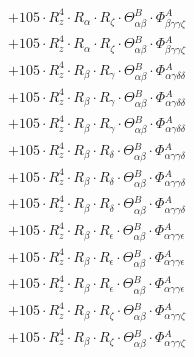 \documentclass{article}
\begin{document}
\begin{subequations}
\begin{gather}
\begin{array}{c}
 \\[0.2em] 		 + 105 \cdot R_{z}^{4} \cdot R_{\alpha{}} \cdot R_{\zeta{}} \cdot \Theta{}^{B}_{\alpha{}\beta{}} \cdot \Phi{}^{A}_{\beta{}\gamma{}\gamma{}\zeta{}} 
 \\[0.2em] 		 + 105 \cdot R_{z}^{4} \cdot R_{\alpha{}} \cdot R_{\zeta{}} \cdot \Theta{}^{B}_{\alpha{}\beta{}} \cdot \Phi{}^{A}_{\beta{}\gamma{}\gamma{}\zeta{}} 
 \\[0.2em] 		 + 105 \cdot R_{z}^{4} \cdot R_{\beta{}} \cdot R_{\gamma{}} \cdot \Theta{}^{B}_{\alpha{}\beta{}} \cdot \Phi{}^{A}_{\alpha{}\gamma{}\delta{}\delta{}} 
 \\[0.2em] 		 + 105 \cdot R_{z}^{4} \cdot R_{\beta{}} \cdot R_{\gamma{}} \cdot \Theta{}^{B}_{\alpha{}\beta{}} \cdot \Phi{}^{A}_{\alpha{}\gamma{}\delta{}\delta{}} 
 \\[0.2em] 		 + 105 \cdot R_{z}^{4} \cdot R_{\beta{}} \cdot R_{\gamma{}} \cdot \Theta{}^{B}_{\alpha{}\beta{}} \cdot \Phi{}^{A}_{\alpha{}\gamma{}\delta{}\delta{}} 
 \\[0.2em] 		 + 105 \cdot R_{z}^{4} \cdot R_{\beta{}} \cdot R_{\delta{}} \cdot \Theta{}^{B}_{\alpha{}\beta{}} \cdot \Phi{}^{A}_{\alpha{}\gamma{}\gamma{}\delta{}} 
 \\[0.2em] 		 + 105 \cdot R_{z}^{4} \cdot R_{\beta{}} \cdot R_{\delta{}} \cdot \Theta{}^{B}_{\alpha{}\beta{}} \cdot \Phi{}^{A}_{\alpha{}\gamma{}\gamma{}\delta{}} 
 \\[0.2em] 		 + 105 \cdot R_{z}^{4} \cdot R_{\beta{}} \cdot R_{\delta{}} \cdot \Theta{}^{B}_{\alpha{}\beta{}} \cdot \Phi{}^{A}_{\alpha{}\gamma{}\gamma{}\delta{}} 
 \\[0.2em] 		 + 105 \cdot R_{z}^{4} \cdot R_{\beta{}} \cdot R_{\epsilon{}} \cdot \Theta{}^{B}_{\alpha{}\beta{}} \cdot \Phi{}^{A}_{\alpha{}\gamma{}\gamma{}\epsilon{}} 
 \\[0.2em] 		 + 105 \cdot R_{z}^{4} \cdot R_{\beta{}} \cdot R_{\epsilon{}} \cdot \Theta{}^{B}_{\alpha{}\beta{}} \cdot \Phi{}^{A}_{\alpha{}\gamma{}\gamma{}\epsilon{}} 
 \\[0.2em] 		 + 105 \cdot R_{z}^{4} \cdot R_{\beta{}} \cdot R_{\epsilon{}} \cdot \Theta{}^{B}_{\alpha{}\beta{}} \cdot \Phi{}^{A}_{\alpha{}\gamma{}\gamma{}\epsilon{}} 
 \\[0.2em] 		 + 105 \cdot R_{z}^{4} \cdot R_{\beta{}} \cdot R_{\zeta{}} \cdot \Theta{}^{B}_{\alpha{}\beta{}} \cdot \Phi{}^{A}_{\alpha{}\gamma{}\gamma{}\zeta{}} 
 \\[0.2em] 		 + 105 \cdot R_{z}^{4} \cdot R_{\beta{}} \cdot R_{\zeta{}} \cdot \Theta{}^{B}_{\alpha{}\beta{}} \cdot \Phi{}^{A}_{\alpha{}\gamma{}\gamma{}\zeta{}} 

\end{array}
\end{gather}
\end{subequations}
\end{document}

